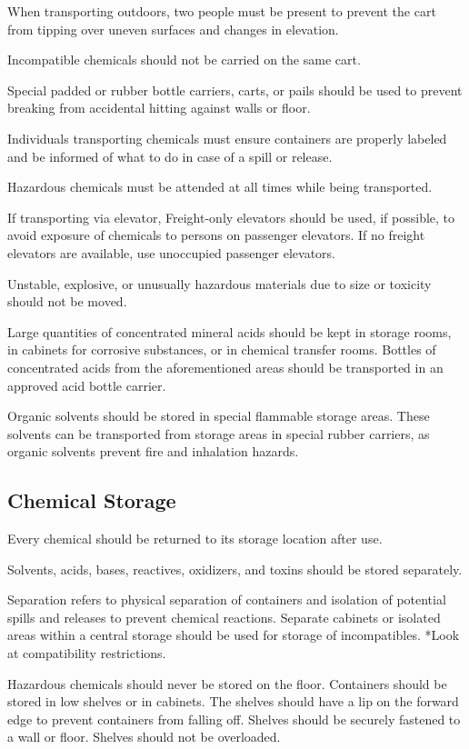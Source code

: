 \documentclass[12pt]{../SOP2}
\begin{document}
\NP When transporting outdoors, two people must be present to prevent the cart from tipping over uneven surfaces and changes in elevation.

\NP Incompatible chemicals should not be carried on the same cart. 

\NP Special padded or rubber bottle carriers, carts, or pails should be used to prevent breaking from accidental hitting against walls or floor. 

\NP Individuals transporting chemicals must ensure containers are properly labeled and be informed of what to do in case of a spill or release. 

\NP Hazardous chemicals must be attended at all times while being transported.

\NP If transporting via elevator, Freight-only elevators should be used, if possible, to avoid exposure of chemicals to persons on passenger elevators. If no freight elevators are available, use unoccupied passenger elevators.  

\NP Unstable, explosive, or unusually hazardous materials due to size or toxicity should not be moved. 

\NP Large quantities of concentrated mineral acids should be kept in storage rooms, in cabinets for corrosive substances, or in chemical transfer rooms. Bottles of concentrated acids from the aforementioned areas should be transported in an approved acid bottle carrier. 

\NP Organic solvents should be stored in special flammable storage areas. These solvents can be transported from storage areas in special rubber carriers, as organic solvents prevent fire and inhalation hazards. 

\subsection*{Chemical Storage}

\NP Every chemical should be returned to its storage location after use. 

\NP Solvents, acids, bases, reactives, oxidizers, and toxins should be stored separately.

\NP Separation refers to physical separation of containers and isolation of potential spills and releases to prevent chemical reactions. Separate cabinets or isolated areas within a central storage should be used for storage of incompatibles. *Look at compatibility restrictions. 

\NP Hazardous chemicals should never be stored on the floor. Containers should be stored in low shelves or in cabinets. The shelves should have a lip on the forward edge to prevent containers from falling off. Shelves should be securely fastened to a wall or floor. Shelves should not be overloaded.
\end{document}
